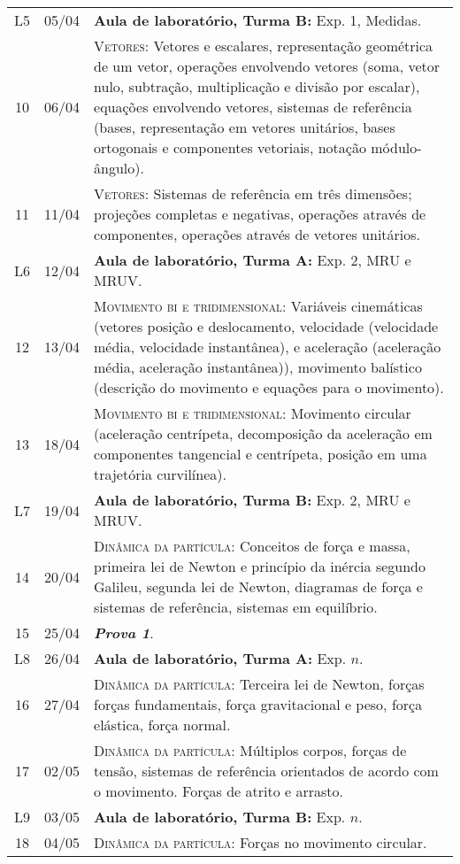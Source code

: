 \begin{center}
\begin{longtable}{ccp{70mm}}
L5   &  05/04    &  \textbf{Aula de laboratório, Turma B:} Exp. 1, Medidas. \\
10	 & 	06/04	 & 	\textsc{Vetores:} Vetores e escalares, representação geométrica de um vetor, operações envolvendo vetores (soma, vetor nulo, subtração, multiplicação e divisão por escalar), equações envolvendo vetores, sistemas de referência (bases, representação em vetores unitários, bases ortogonais e componentes vetoriais, notação módulo-ângulo). \\
11	 & 	11/04	 & 	\textsc{Vetores:} Sistemas de referência em três dimensões; projeções completas e negativas, operações através de componentes, operações através de vetores unitários. \\
L6   &  12/04    &  \textbf{Aula de laboratório, Turma A:} Exp. 2, MRU e MRUV. \\
12	 & 	13/04	 & 	\textsc{Movimento bi e tridimensional:} Variáveis cinemáticas (vetores posição e deslocamento, velocidade (velocidade média, velocidade instantânea), e aceleração (aceleração média, aceleração instantânea)), movimento balístico (descrição do movimento e equações para o movimento). \\
13	 & 	18/04	 & 	\textsc{Movimento bi e tridimensional:} Movimento circular (aceleração centrípeta, decomposição da aceleração em componentes tangencial e centrípeta, posição em uma trajetória curvilínea). \\
L7   &  19/04    &  \textbf{Aula de laboratório, Turma B:} Exp. 2, MRU e MRUV. \\
14	 & 	20/04	 & 	\textsc{Dinâmica da partícula:} Conceitos de força e massa, primeira lei de Newton e princípio da inércia segundo Galileu, segunda lei de Newton, diagramas de força e sistemas de referência, sistemas em equilíbrio.\\
15	 & 	25/04	 &  \textbf{\textit{Prova 1}}.\\
L8   &  26/04    &  \textbf{Aula de laboratório, Turma A:} Exp. $n$. \\
16	 & 	27/04	 & 	\textsc{Dinâmica da partícula:} Terceira lei de Newton, forças forças fundamentais, força gravitacional e peso, força elástica, força normal.\\
17	 & 	02/05	 & 	\textsc{Dinâmica da partícula:} Múltiplos corpos, forças de tensão, sistemas de referência orientados de acordo com o movimento. Forças de atrito e arrasto.\\
L9   &  03/05    &  \textbf{Aula de laboratório, Turma B:} Exp. $n$. \\
18	 & 	04/05	 & 	\textsc{Dinâmica da partícula:} Forças no movimento circular. \\

\end{longtable}
\end{center}
